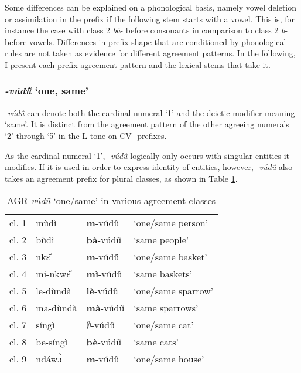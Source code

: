 Some differences can be explained on a phonological basis, namely vowel deletion or assimilation in the prefix if the following stem starts with a vowel. This is, for instance the case with class 2 {\itshape bà}- before consonants in comparison to class 2 {\itshape b}- before vowels. Differences in prefix shape that are conditioned by phonological rules are not taken as evidence for different agreement patterns. In the following, I present each prefix agreement pattern and the lexical stems that take it.



\subsubsection{{\itshape -vúdũ̂} `one, same'} 
\label{sec:one}

{\itshape -vúdũ̂} can denote both the cardinal numeral `1' and the deictic modifier meaning `same'. It is distinct from the agreement pattern of the other agreeing numerals `2' through `5' in the L tone on CV- prefixes.

As the cardinal numeral `1', {\itshape -vúdũ̂} logically only occurs with singular entities it modifies. If it is used in order to express identity of entities, however, {\itshape -vúdũ̂} also takes an agreement prefix for plural classes, as shown in Table \ref{Tab:same}. 

\begin{table} 
\centering
\begin{tabular}{llll}
 \midrule
cl. 1 & mùdì & {\bfseries m}-vúdũ̂  & `one/same person' \\
cl. 2 & bùdì & {\bfseries bà}-vúdũ̂ & `same people' \\
cl. 3 & nkɛ̌ & {\bfseries m}-vúdũ̂́ & `one/same basket' \\
cl. 4 & mi-nkwɛ̌ & {\bfseries mì}-vúdũ̂ & `same baskets' \\
cl. 5 & le-dùndà & {\bfseries lè}-vúdũ̂ & `one/same sparrow' \\
cl. 6 & ma-dùndà & {\bfseries mà}-vúdũ̂ &  `same sparrows' \\
cl. 7 & síngì & {\bfseries $\emptyset$}-vúdũ̂ & `one/same cat' \\
cl. 8 & be-síngì & {\bfseries bè}-vúdũ̂ & `same cats' \\
cl. 9 & ndáwɔ̀ & {\bfseries m}-vúdũ̂ & `one/same house' \\
 \midrule
\end{tabular}
\caption{AGR-{\itshape vúdũ̂} `one/same' in various agreement classes}
\label{Tab:same}
\end{table}


